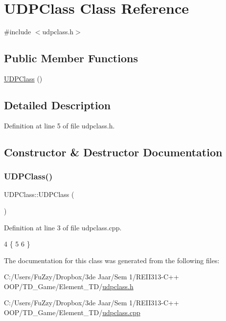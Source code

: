 \hypertarget{class_u_d_p_class}{}\section{U\+D\+P\+Class Class Reference}
\label{class_u_d_p_class}


{\ttfamily \#include $<$udpclass.\+h$>$}

\subsection*{Public Member Functions}
\begin{DoxyCompactItemize}
\item 
\hyperlink{class_u_d_p_class_aea79eb2fa6dccf4a5418b37625b1b9b2}{U\+D\+P\+Class} ()
\end{DoxyCompactItemize}


\subsection{Detailed Description}


Definition at line 5 of file udpclass.\+h.



\subsection{Constructor \& Destructor Documentation}
\mbox{\label{class_u_d_p_class_aea79eb2fa6dccf4a5418b37625b1b9b2}} 
\subsubsection{\texorpdfstring{U\+D\+P\+Class()}{UDPClass()}}
{\footnotesize\ttfamily U\+D\+P\+Class\+::\+U\+D\+P\+Class (\begin{DoxyParamCaption}{ }\end{DoxyParamCaption})}



Definition at line 3 of file udpclass.\+cpp.


\begin{DoxyCode}
4 \{
5 
6 \}
\end{DoxyCode}


The documentation for this class was generated from the following files\+:\begin{DoxyCompactItemize}
\item 
C\+:/\+Users/\+Fu\+Zzy/\+Dropbox/3de Jaar/\+Sem 1/\+R\+E\+I\+I313-\/\+C++ O\+O\+P/\+T\+D\+\_\+\+Game/\+Element\+\_\+\+T\+D/\hyperlink{udpclass_8h}{udpclass.\+h}\item 
C\+:/\+Users/\+Fu\+Zzy/\+Dropbox/3de Jaar/\+Sem 1/\+R\+E\+I\+I313-\/\+C++ O\+O\+P/\+T\+D\+\_\+\+Game/\+Element\+\_\+\+T\+D/\hyperlink{udpclass_8cpp}{udpclass.\+cpp}\end{DoxyCompactItemize}
